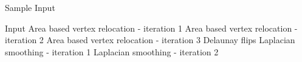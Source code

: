 \documentclass{beamer}
\begin{document}

\begin{frame}[plain]{Sample Input}

   {Input}
   {Area based vertex relocation - iteration 1}
   {Area based vertex relocation - iteration 2}
   {Area based vertex relocation - iteration 3}
   {Delaunay flips}
   {Laplacian smoothing - iteration 1}
   {Laplacian smoothing - iteration 2}
  
  \begin{figure}

\end{figure}
\end{frame}
\end{document}
